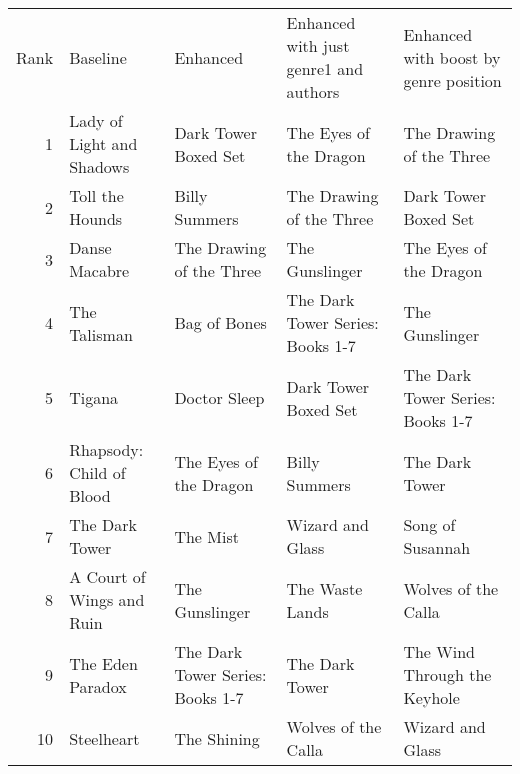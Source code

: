 \begin{tabular}{rllll}
Rank & Baseline & Enhanced & Enhanced with just genre1 and authors & Enhanced with boost by genre position \\
1 & Lady of Light and Shadows & Dark Tower Boxed Set & The Eyes of the Dragon & The Drawing of the Three \\
2 & Toll the Hounds & Billy Summers & The Drawing of the Three & Dark Tower Boxed Set \\
3 & Danse Macabre & The Drawing of the Three & The Gunslinger & The Eyes of the Dragon \\
4 & The Talisman & Bag of Bones & The Dark Tower Series: Books 1-7 & The Gunslinger \\
5 & Tigana & Doctor Sleep & Dark Tower Boxed Set & The Dark Tower Series: Books 1-7 \\
6 & Rhapsody: Child of Blood & The Eyes of the Dragon & Billy Summers & The Dark Tower \\
7 & The Dark Tower & The Mist & Wizard and Glass & Song of Susannah \\
8 & A Court of Wings and Ruin & The Gunslinger & The Waste Lands & Wolves of the Calla \\
9 & The Eden Paradox & The Dark Tower Series: Books 1-7 & The Dark Tower & The Wind Through the Keyhole \\
10 & Steelheart & The Shining & Wolves of the Calla & Wizard and Glass \\
\end{tabular}
